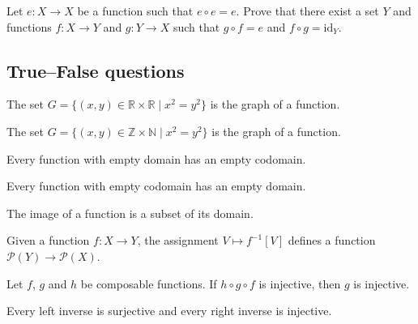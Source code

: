 \begin{chapex}
Let $e : X \to X$ be a function such that $e \circ e = e$. Prove that there exist a set $Y$ and functions $f : X \to Y$ and $g : Y \to X$ such that $g \circ f = e$ and $f \circ g = \mathrm{id}_Y$.
\end{chapex}

\subsection*{True--False questions}


\begin{chapex} %
\label{cqFunctionsTFBegin}
The set $G = \{ (x,y) \in \mathbb{R} \times \mathbb{R} \mid x^2=y^2 \}$ is the graph of a function.
\end{chapex}

\begin{chapex} %
The set $G = \{ (x,y) \in \mathbb{Z}\times \mathbb{N} \mid x^2=y^2 \}$ is the graph of a function.
\end{chapex}

\begin{chapex} %
Every function with empty domain has an empty codomain.
\end{chapex}

\begin{chapex} %
Every function with empty codomain has an empty domain.
\end{chapex}

\begin{chapex} %
The image of a function is a subset of its domain.
\end{chapex}

\begin{chapex} %
Given a function $f : X \to Y$, the assignment $V \mapsto f^{-1}[V]$ defines a function $\mathcal{P}(Y) \to \mathcal{P}(X)$.
\end{chapex}

\begin{chapex} %
Let $f$, $g$ and $h$ be composable functions. If $h \circ g \circ f$ is injective, then $g$ is injective.
\end{chapex}

\begin{chapex} %
\label{cqFunctionsTFEnd}
Every left inverse is surjective and every right inverse is injective.
\end{chapex}

